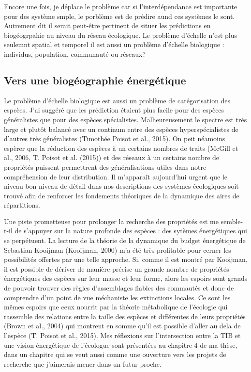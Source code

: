 Encore une fois, je déplace le problème car si l'interdépendance est
importante pour des système smple, le porblème est de prédire aund ces
systèmes le sont. Autrement dit il serait peut-être pertinent de situer
les prédictions en biogéogrpahie au niveau du réseau écologique. Le
problème d'échelle n'est plus seulemnt spatial et temporel il est aussi
un problème d'échelle biologique : individus, population, communauté ou
réseaux?

\subsection*{Vers une biogéographie
énergétique}\label{vers-une-bioguxe9ographie-uxe9nerguxe9tique}

Le problème d'échelle biologique est aussi un problème de catégorisation
des espcèes. J'ai suggéré que les prédiction étaient plus facile pour
des espèces généralistes que pour des espèces spécialistes.
Malheureusement le spectre est très large et plutôt balancé avec un
continum entre des espèces hyperspécialistes de d'autres très
généralistes (Timothée Poisot et al., 2015). On peit néamoins espèrer
que la réduction des espèces à un certains nombres de traits (McGill et
al., 2006, T. Poisot et al. (2015)) et des réseaux à un certains nombre
de propriétés puissent permettrent des généralisations utiles dans notre
compréhension de leur distribution. Il m'apparaît aujourd'hui urgent que
le niveau bon niveau de détail dans nos descriptions des systèmes
écologiques soit trouvé afin de renforcer les fondements théoriques de
la dynamique des aires de répartitions.

Une piste prometteuse pour prolonger la recherche des propriétés est me
semble-t-il de s'appuyer sur la nature profonde des espèces : des
sytèmes énergétiques qui se perpétuent. La lecture de la théorie de la
dynamique du budget énergétique de Sebastian Kooijman (Kooijman, 2000)
m'a été très profitable pour cerner les possibilités offertes par une
telle approche. Si, comme il est montré par Kooijman, il est possible de
dériver de manière précise un grande nombre de propriétés énergétiques
des espèces sur leur masse et leur forme, alors les espoirs sont grands
de pouvoir trouver des règles d'assemblages fiables des commautés et
donc de comprendre d'un point de vue méchaniste les extinctions locales.
Ce sont les mêmes espoirs que ceux nourrit par la théorie métabolique de
l'écologie qui rassemble des relations entre la taille des espèces et
différentes de leurs propriétés (Brown et al., 2004) qui montrent en
somme qu'il est possible d'aller au dela de l'espèce (T. Poisot et al.,
2015). Mes réflexions sur l'intersection entre la TIB et une vision
énergétique de l'écologue sont présentées au chapitre 4 de ma thèse,
dans un chapitre qui se veut aussi comme une ouverture vers les projets
de recherche que j'aimerais mener dans un futur proche.

